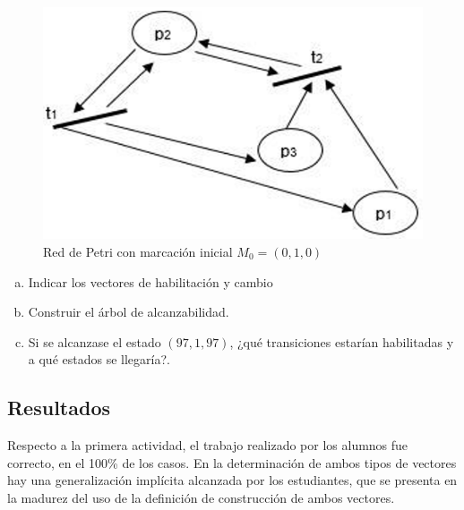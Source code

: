 \documentclass[oneside,spanish]{amsart}
\numberwithin{equation}{section}
\theoremstyle{definition}
\begin{document}
\begin{figure}[h]
	\centering
	\includegraphics[height=0.2\textheight]{Anexos-07/Imagen1}
	\caption{Red de Petri con marcación inicial $M_0=(0,1,0)$}
	\label{fig:1}
\end{figure}

\begin{enumerate}[a)]
	\item	Indicar los vectores de habilitación y cambio
	\item	Construir el árbol de alcanzabilidad.
	\item	Si se alcanzase el estado $(97,1,97)$, ¿qué transiciones estarían habilitadas y a qué estados se llegaría?.
\end{enumerate}

\subsection{Resultados}

Respecto a la primera actividad, el trabajo realizado por los alumnos fue correcto, en el 100\% de los casos. En la determinación de ambos tipos de vectores hay una generalización implícita alcanzada por los estudiantes, que se presenta en la madurez del uso de la definición de construcción de ambos vectores.
\end{document}
